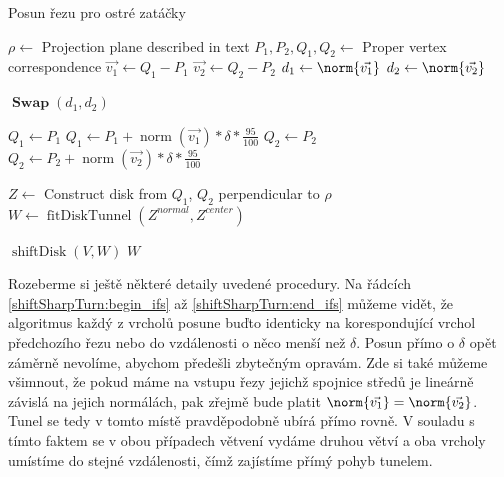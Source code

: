 \begin{algorithm}
\caption{Posun řezu pro ostré zatáčky}
\label{alg:shiftSharpTurn}
\begin{algorithmic}[1]

    \State $ \rho \gets $ Projection plane described in text
    \State $ P_1, P_2, Q_1, Q_2 \gets $ Proper vertex correspondence
    \State $ \vec{v_1} \gets Q_1 - P_1 $
    \State $ \vec{v_2} \gets Q_2 - P_2 $
    \State $ d_1 \gets \norm{\vec{v_1}} $
    \State $ d_2 \gets \norm{\vec{v_2}} $

    \Statex
        \State $ \operatorname{\mathbf{Swap}}(d_1, d_2) $
    \EndIf

    \Statex
     \label{shiftSharpTurn:begin_ifs}
        \State $ Q_1 \gets P_1$
    \Else
        \State $ Q_1 \gets P_1 + \operatorname{norm}(\vec{v_1}) * \delta * \frac{95}{100} $
    \EndIf
        \State $ Q_2 \gets P_2$
    \Else
        \State $ Q_2 \gets P_2 + \operatorname{norm}(\vec{v_2}) * \delta * \frac{95}{100} $ \label{shiftSharpTurn:end_ifs}
    \EndIf

    \Statex
    \State $ Z \gets $ Construct disk from $ Q_1$, $Q_2$ perpendicular to $ \rho $
    \State $ W \gets \operatorname{fitDiskTunnel}(Z^{normal}, Z^{center}) $
    \Statex

        \State \Return $ \operatorname{shiftDisk}(V, W) $ \label{shiftSharpTurn:shift_disk}
    \Else
        \State \Return $ W $
    \EndIf

\EndFunction

\end{algorithmic}
\end{algorithm}

Rozeberme si ještě některé detaily uvedené procedury. Na řádcích
\ref{shiftSharpTurn:begin_ifs} až \ref{shiftSharpTurn:end_ifs} můžeme vidět, že
algoritmus každý z vrcholů posune buďto identicky na korespondující vrchol
předchozího řezu nebo do vzdálenosti o něco menší než $ \delta $. Posun přímo
o $ \delta $ opět záměrně nevolíme, abychom předešli zbytečným opravám. Zde si
také můžeme všimnout, že pokud máme na vstupu řezy jejichž spojnice středů
je lineárně závislá na jejich normálách, pak zřejmě bude platit
$ \norm{\vec{v_1}} = \norm{\vec{v_2}} $. Tunel se tedy v tomto místě
pravděpodobně ubírá přímo rovně. V souladu s tímto faktem se v obou případech
větvení vydáme druhou větví a oba vrcholy umístíme do stejné vzdálenosti, čímž
zajístíme přímý pohyb tunelem.

